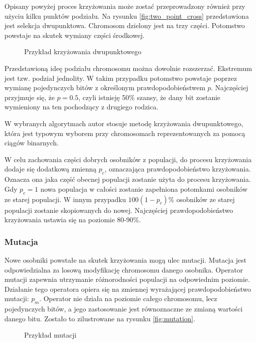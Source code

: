 \documentclass[twoside]{iisthesis}
\begin{document}
Opisany powyżej proces krzyżowania może zostać przeprowadzony również przy użyciu kilku punktów podziału. Na rysunku \eqref{fig:two_point_cross} przedstawiona jest selekcja dwupunktowa. Chromosom dzielony jest na trzy części. Potomstwo powstaje na skutek wymiany części środkowej.
\begin{figure}[!htb]
	\centering
	\caption{Przykład krzyżowania dwupunktowego}
	\label{fig:two_point_cross}
\end{figure}

Przedstawioną ideę podziału chromosomu można dowolnie rozszerzać. Ekstremum jest tzw. podział jednolity. W takim przypadku potomstwo powstaje poprzez wymianę pojedynczych bitów z określonym prawdopodobieństwem $p$. Najczęściej przyjmuje się, że $p = 0.5$, czyli istnieję 50\% szansy, że dany bit zostanie wymieniony na ten pochodzący z drugiego rodzica.

W wybranych algorytmach autor stosuje metodę krzyżowania dwupunktowego, która jest typowym wyborem przy chromosomach reprezentowanych za pomocą ciągów binarnych.

W celu zachowania części dobrych osobników z populacji, do procesu krzyżowania dodaje się dodatkową zmienną $p_{c}$, oznaczająca prawdopodobieństwo krzyżowania. Oznacza ona jaka część obecnej populacji zostanie użyta do procesu krzyżowania. Gdy $p_{c} = 1$ nowa populacja w całości zostanie zapełniona potomkami osobników ze starej populacji. W innym przypadku $100(1 - p_{c})\%$ osobników ze starej populacji zostanie skopiowanych do nowej. Najczęściej prawdopodobieństwo krzyżowania ustawia się na poziomie 80-90\%.
\subsubsection{Mutacja}
Nowe osobniki powstałe na skutek krzyżowania mogą ulec mutacji. Mutacja jest odpowiedzialna za losową modyfikację chromosomu danego osobnika. Operator mutacji zapewnia utrzymanie różnorodności populacji na odpowiednim poziomie. Działanie tego operatora opiera się na zmiennej wyrażającej prawdopodobieństwo mutacji: $p_{m}$. Operator nie działa na poziomie całego chromosomu, lecz pojedynczych bitów, a jego zastosowanie jest równoznaczne ze zmianą wartości danego bitu. Zostało to zilustrowane na rysunku \eqref{fig:mutation}.
\begin{figure}[!htb]
	\centering
	\caption{Przykład mutacji}
	\label{fig:mutation}
\end{figure}
\end{document}
